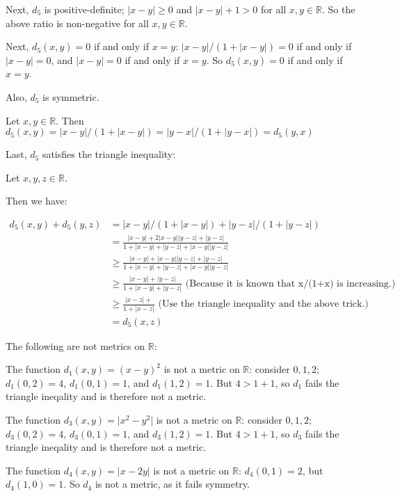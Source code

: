 \documentclass[a4paper,12pt]{article}
\newcommand{\tab}{\hspace{4mm}} %
\newcommand{\absval}[1]{\lvert #1 \rvert}
\newcommand{\R}{\mathbb{R}}
\begin{document}
\tab Next, $d_5$ is positive-definite; $\absval{x-y} \geq 0$ and $\absval{x-y} +1 > 0$ for all $x,y \in \R$. So the above ratio is non-negative for all $x,y \in \R$.

\tab Next, $d_5(x,y) = 0$ if and only if $x=y$: $\absval{x-y}/(1+\absval{x-y}) = 0$ if and only if $\absval{x-y} = 0$, and $\absval{x-y}=0$ if and only if $x=y$. So $d_5(x,y) = 0$ if and only if $x=y$.

\tab Also, $d_5$ is symmetric.

\tab \tab Let $x,y \in \R$. Then $d_5(x,y)= \absval{x-y}/(1+\absval{x-y}) = \absval{y-x}/(1+\absval{y-x})=d_5(y,x)$

\tab Last, $d_5$ satisfies the triangle inequality:

\tab \tab Let $x,y,z \in \R$.

\tab \tab Then we have:

\begin{align*}
d_5(x,y) +d_5(y,z) &= \absval{x-y}/(1+\absval{x-y}) + \absval{y-z}/(1+\absval{y-z}) \\
&= \frac{\absval{x-y}+2\absval{x-y}\absval{y-z} + \absval{y-z}}{1+\absval{x-y}+\absval{y-z}+\absval{x-y}\absval{y-z}}\\
&\geq \frac{\absval{x-y}+\absval{x-y}\absval{y-z} + \absval{y-z}}{1+\absval{x-y}+\absval{y-z}+\absval{x-y}\absval{y-z}}\\
&\geq \frac{\absval{x-y} + \absval{y-z}}{1+\absval{x-y}+\absval{y-z}} \text{ (Because it is known that x/(1+x) is increasing.)}\\
&\geq \frac{\absval{x-z} +}{1+\absval{x-z}} \text{ (Use the triangle inequality and the above trick.)} \\
&=d_5(x,z)
\end{align*}

The following are not metrics on $\R$:

The function $d_1(x,y) = (x-y)^2$ is not a metric on $\R$: consider $0,1,2$; $d_1(0,2) = 4$, $d_1(0,1) = 1$, and $d_1(1,2) = 1$. But $4 > 1+1$, so $d_1$ fails the triangle ineqality and is therefore not a metric.

The function $d_3(x,y) = \absval{x^2-y^2}$ is not a metric on $\R$: consider $0,1,2$; $d_3(0,2) = 4$, $d_3(0,1) = 1$, and $d_3(1,2) = 1$. But $4 > 1+1$, so $d_3$ fails the triangle ineqality and is therefore not a metric. 

The function $d_4(x,y) = \absval{x -2y}$ is not a metric on $\R$: $d_4(0,1) = 2$, but $d_4(1,0) = 1$. So $d_4$ is not a metric, as it fails symmetry.
\end{document}
